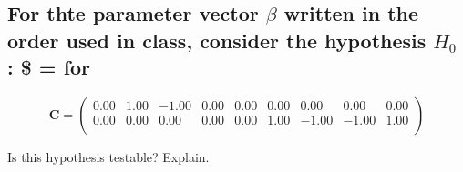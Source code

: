 \documentclass[11pt]{article}
\begin{document}
\subsection{For thte parameter vector $\beta$ written in the order used in class, consider the hypothesis $H_0$ : \$ =  for}
\label{sec-5-2}





$$\mathbf{C} =
\begin{pmatrix}{}
  0.00 & 1.00 & -1.00 & 0.00 & 0.00 & 0.00 & 0.00 & 0.00 & 0.00 \\ 
  0.00 & 0.00 & 0.00 & 0.00 & 0.00 & 1.00 & -1.00 & -1.00 & 1.00 \\ 
  \end{pmatrix}$$

Is this hypothesis testable? Explain.
\end{document}

